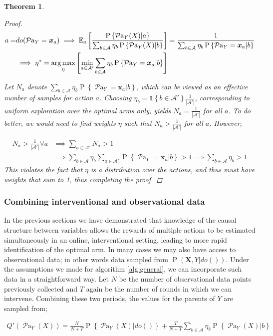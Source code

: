 \documentclass[11pt,a4paper,twoside]{report}
\newcommand{\EE}{\mathbb E}
\newcommand{\EEa}{\EE_a}
\newcommand{\Pn}[2]{\operatorname{P}\left\{#2|#1\right\}}
\newcommand{\calA}{\mathcal A}
\newcommand{\set}[1]{\left\{#1\right\}}
\newcommand{\ind}[1]{\mathds{1}\!\!\set{#1}}
\newcommand{\argmax}{\operatornamewithlimits{arg\,max}}
\newcommand{\eqn}[1]{\begin{align}#1\end{align}}
\newcommand{\eq}[1]{\begin{align*}#1\end{align*}}
\renewcommand{\P}[1]{\operatorname{P}\left(#1\right)}
\newcommand{\parents}[1]{\operatorname{\mathcal{P}a}_{#1}}
\renewcommand{\vec}[1]{\boldsymbol{#1}}
\theoremstyle{plain}
\newtheorem{theorem}{Theorem}
\theoremstyle{definition}
\begin{document}
\begin{theorem}
\begin{proof}
\eq{
a =& do(\parents{Y} = \vec{x}_a) \implies \EEa \left[\frac{\Pn{a}{\parents{Y}(X)}}{\sum_{b \in \calA} \eta_b \Pn{b}{\parents{Y}(X)}}\right] = \frac{1}{\sum_{b \in \calA} \eta_b \Pn{b}{\parents{Y}=\vec{x}_a}}\\
& \implies \eta^* = \argmax_\eta \left[\min_{a \in \mathcal{A'}} \sum_{b \in \calA} \eta_b \Pn{b}{\parents{Y}=\vec{x}_a} \right] 
}

Let $N_a$ denote $\sum_{b \in \calA} \eta_b \Pn{b}{\parents{Y}=\vec{x}_a}$, which can be viewed as an effective number of samples for action $a$. Choosing $\eta_b = \ind{b \in \mathcal{A'}}\frac{1}{|\mathcal{A'}|}$, corresponding to uniform exploration over the optimal arms only, yields $N_a = \frac{1}{|\mathcal{A'}|}$ for all $a$. To do better, we would need to find weights $\eta$ such that $N_a > \frac{1}{|\mathcal{A'}|}$ for all $a$. However,

\eq{
N_a > \frac{1}{|\mathcal{A'}|} \forall{a} &\implies \sum_{a\in \mathcal{A'}}N_a > 1\\ 
&\implies \sum_{b \in \calA}\eta_b\sum_{a\in \mathcal{A'}}  \Pn{b}{\parents{Y}=\vec{x}_a} > 1
\implies \sum_{b \in \calA}\eta_b > 1
}
This violates the fact that $\eta$ is a distribution over the actions, and thus must have weights that sum to 1, thus completing the proof.
\end{proof}
\end{theorem} 

\subsubsection{Combining interventional and observational data}

In the previous sections we have demonstrated that knowledge of the causal structure between variables allows the rewards of multiple actions to be estimated simultaneously in an online, interventional setting, leading to more rapid identification of the optimal arm. In many cases we may also have access to observational data; in other words data sampled from $\P{\vec{X},Y|do()}$. Under the assumptions we made for algorithm \ref{alg:general}, we can incorporate such data in a straightforward way. Let $N$ be the number of observational data points previously collected and $T$ again be the number of rounds in which we can intervene. Combining these two periods, the values for the parents of $Y$ are sampled from;

\eqn {
Q'(\parents{Y}(X)) = \frac{N}{N+T}\Pn{do()}{\parents{Y}(X)} + \frac{T}{N+T}\sum_{b \in \calA}{\eta_b \Pn{b}{\parents{Y}(X)}}
}
\end{document}
